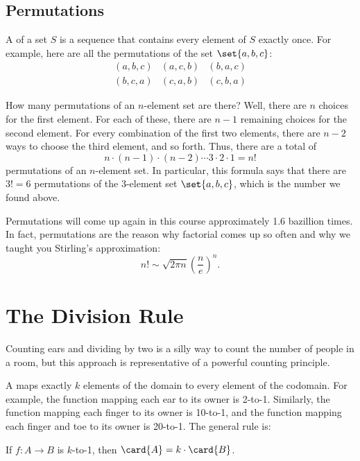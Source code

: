 \subsection{Permutations}

A  of a set $S$ is a sequence that contains every
element of $S$ exactly once.  For example, here are all the
permutations of the set $\set{a, b, c}$:
%
\[
\begin{array}{ccc}
(a, b, c) & (a, c, b) & (b, a, c) \\
(b, c, a) & (c, a, b) & (c, b, a)
\end{array}
\]

How many permutations of an $n$-element set are there?  Well, there
are $n$ choices for the first element.  For each of these, there are
$n - 1$ remaining choices for the second element.  For every
combination of the first two elements, there are $n - 2$ ways to
choose the third element, and so forth.  Thus, there are a total of
%
\[
n \cdot (n-1) \cdot (n-2) \cdots 3 \cdot 2 \cdot 1 = n!
\]
%
permutations of an $n$-element set.  In particular, this formula says
that there are $3! = 6$ permutations of the 3-element set $\set{a, b,
c}$, which is the number we found above.

Permutations will come up again in this course approximately 1.6
bazillion times.  In fact, permutations are the reason why factorial
comes up so often and why we taught you Stirling's approximation:
%
\[
n! \sim \sqrt{2 \pi n} \left(\frac{n}{e}\right)^n.
\]


\begin{problems}
\homeworkproblems
{}
\end{problems}


\section{The Division Rule}\label{division_rule_sec}

Counting ears and dividing by two is a silly way to count the number of
people in a room, but this approach is representative of a powerful
counting principle.

A  maps exactly $k$ elements of the domain to
every element of the codomain.  For example, the function mapping each
ear to its owner is 2-to-1. Similarly, the function mapping each
finger to its owner is 10-to-1, and the function mapping each finger
and toe to its owner is 20-to-1.  The general rule is:
\begin{rul}
If $f : A \to B$ is $k$-to-1, then $\card{A} = k \cdot \card{B}$.
\end{rul}

